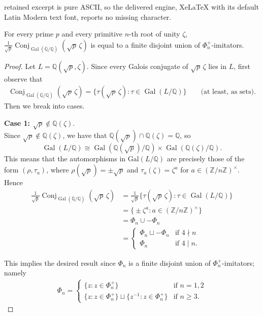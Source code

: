 \documentclass[10pt,a4paper]{amsart}
\newcommand{\QQ}{\mathbb{Q}}
\newcommand{\ZZ}{\mathbb{Z}}
\begin{document}
retained excerpt is pure ASCII, so the delivered engine, XeLaTeX with its default Latin Modern text font, reports no missing character.
\begin{lemma}\label{lem:conjugates-shape}
For every prime $p$ and every
primitive $n$-th root of unity $\zeta$, 
$\frac{1}{\sqrt p} \operatorname{Conj}_{\operatorname{Gal}(\overline{\QQ}/\QQ)}(\sqrt p\,\zeta)$ is equal to a finite disjoint union of $\Phi_n^+$-imitators.
\end{lemma}

\begin{proof}
Let $L=\QQ(\sqrt p,\zeta)$. Since every Galois conjugate of $\sqrt p\,\zeta$ lies in $L$, first observe that
\begin{align}
    \operatorname{Conj}_{\operatorname{Gal}(\overline{\QQ}/\QQ)}(\sqrt p\,\zeta)=\big\{\tau(\sqrt p\,\zeta):\tau\in\operatorname{Gal}(L/\QQ)\big\} \qquad \text{(at least, as sets)}.
\end{align} 
Then we break into cases.

{\bf Case 1: $\sqrt p \notin \QQ(\zeta)$}. \\ 
Since $\sqrt p\notin\QQ(\zeta)$, we have that $\QQ(\sqrt p)\cap\QQ(\zeta)=\QQ$, so 
\[
\operatorname{Gal}(L/\QQ)\cong\operatorname{Gal}(\QQ(\sqrt p)/\QQ)\times\operatorname{Gal}(\QQ(\zeta)/\QQ).
\] 
This means that the automorphisms in $\mathrm{Gal}(L/\QQ)$ are precisely those of the form $(\rho,\tau_a)$, where
$\rho(\sqrt p)=\pm\sqrt p$ and 
$\tau_a(\zeta)=\zeta^a$ for $a\in(\ZZ/n\ZZ)^\times$. 
Hence
\begin{align}
    \frac{1}{\sqrt p} \operatorname{Conj}_{\operatorname{Gal}(\overline{\QQ}/\QQ)}(\sqrt p\,\zeta)
    &= \frac{1}{\sqrt p} \Big\{\tau(\sqrt p\,\zeta):\tau\in\operatorname{Gal}(L/\QQ)\Big\} \\
    &= \Big\{ \pm \zeta^a : a\in(\ZZ/n\ZZ)^\times \Big\} \\
    &= \Phi_n \cup -\Phi_n \\
    &= 
    \begin{cases}
        \Phi_n \sqcup -\Phi_n & \text{if } 4 \nmid n \\
        \Phi_n & \text{if } 4 \mid n.
    \end{cases}
\end{align}

This implies the desired result since $\Phi_n$ is a finite disjoint union of $\Phi_n^+$-imitators; namely
\begin{align}
    \Phi_n = 
    \begin{cases}
        \{ z : z \in \Phi_n^+\} 
        & \text{if } n=1,2 \\
        \{z : z \in\Phi_n^+\}\sqcup\{z^{-1} : z \in \Phi_n^+\}
        & \text{if } n \ge 3.
    \end{cases} 
\end{align}



\end{proof}
\end{document}
